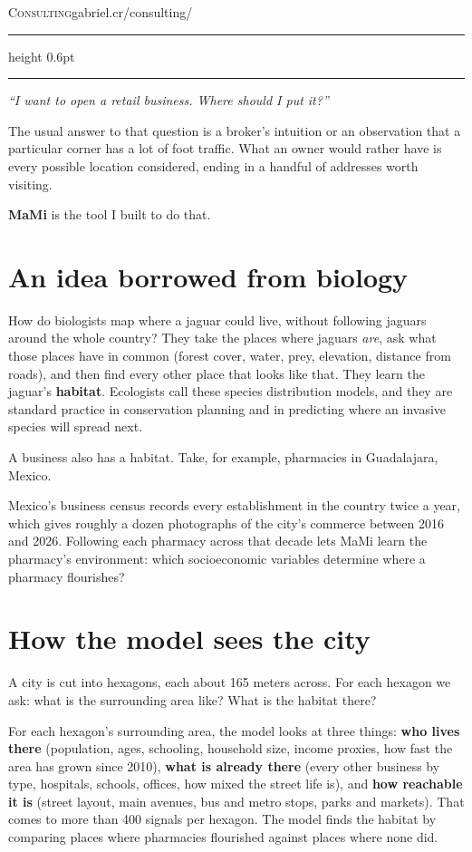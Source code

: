 \documentclass[12pt,letterpaper]{article}
\newcommand{\lede}[1]{%
  \vspace{0.3em}%
  {\color{accent}\rule{2pt}{1.5em}}\hspace{0.7em}%
  \parbox[t]{0.86\linewidth}{\vspace{-1.35em}\large\itshape #1}\par
  \vspace{0.9em}%
}
\begin{document}
{\LARGE\scshape Consulting}\hfill{\color{muted}\small gabriel.cr/consulting/}
\vspace{0.3em}
{\color{accent}\hrule height 0.6pt}
\vspace{1.2em}

\lede{``I want to open a retail business. Where should I put it?''}

The usual answer to that question is a broker's intuition or an observation that a
particular corner has a lot of foot traffic. What an owner would rather have is 
every possible location considered, ending in a handful 
of addresses worth visiting.

\textbf{MaMi} is the tool I built to do that.

\section{An idea borrowed from biology}

How do biologists map where a jaguar could live, without following jaguars
around the whole country? They take the places where jaguars \emph{are}, ask what
those places have in common (forest cover, water, prey, elevation, distance
from roads), and then find every other place that looks like that. They learn
the jaguar's \textbf{habitat}.
Ecologists call these species distribution models, and they are standard practice 
in conservation planning and in predicting where an invasive species will spread next.

A business also has a habitat. Take, for example, pharmacies in Guadalajara, Mexico.

Mexico's business census records every establishment in the country twice a
year, which gives roughly a dozen photographs of the city's commerce between
2016 and 2026. Following each pharmacy across that decade lets MaMi learn the
pharmacy's environment: which socioeconomic variables determine where a pharmacy
flourishes?

\section{How the model sees the city}

A city is cut into hexagons, each about 165 meters across. For
each hexagon we ask: what is the surrounding area like? What is the habitat there?

For each hexagon's surrounding area, the model looks at three things: \textbf{who
lives there} (population, ages, schooling, household size, income proxies, how
fast the area has grown since 2010), \textbf{what is already there} (every other
business by type, hospitals, schools, offices, how mixed the street life is),
and \textbf{how reachable it is} (street layout, main avenues, bus and metro stops,
parks and markets). That comes to more than 400 signals per hexagon. The model finds the habitat
by comparing places where pharmacies flourished against places where none did.
\end{document}
